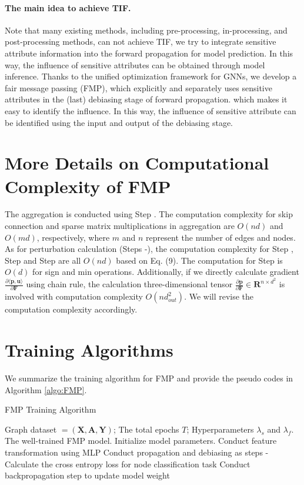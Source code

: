 \documentclass[letterpaper]{article} %
\theoremstyle{plain}
\theoremstyle{definition}
\theoremstyle{remark}
\begin{document}
\paragraph{The main idea to achieve TIF.} Note that many existing methods, including pre-processing, in-processing, and post-processing methods, can not achieve TIF, we try to integrate sensitive attribute information into the forward propagation for model prediction. In this way, the influence of sensitive attributes can be obtained through model inference. Thanks to the unified optimization framework for GNNs, we develop a fair message passing (FMP), which explicitly and separately uses sensitive attributes in the (last) debiasing stage of forward propagation. which makes it easy to identify the influence. In this way,  the influence of sensitive attribute can be identified using the input and output of the debiasing stage. 

\section{More Details on Computational Complexity of FMP}
The aggregation is conducted using Step \textbf{}. The computation complexity for skip connection and sparse matrix multiplications in aggregation are $O(nd)$ and $O(md)$, respectively, where $m$ and $n$ represent the number of edges and nodes. As for perturbation calculation (Steps \textbf{}-\textbf{}), the computation complexity for Step \textbf{}, Step \textbf{} and Step \textbf{} are all $O(nd)$ based on Eq. (9). The computation for Step \textbf{} is $O(d)$ for sign and min operations. Additionally, if we directly calculate gradient $\frac{\partial \langle \mathbf{p}, \mathbf{u}\rangle}{\partial \mathbf{F}}$ using chain rule, the calculation three-dimensional tensor $\frac{\partial \mathbf{p}}{\partial \mathbf{F}}\in \mathbf{R}^{n\times d^2}$ is involved with computation complexity $O(nd_{out}^2)$. We will revise the computation complexity accordingly.

\section{Training Algorithms}
We summarize the training algorithm for FMP and provide the pseudo codes in Algorithm \ref{algo:FMP}.

\begin{algorithm}[htb]
   \caption{FMP Training Algorithm}
   \label{algo:FMP}
\begin{algorithmic}
    Graph dataset $\mathcal=(\mathbf{X}, \mathbf{A}, \mathbf{Y})$; The total epochs $T$; Hyperparameters $\lambda_{s}$ and $\lambda_{f}$.
    The well-trained FMP model.
   \STATE Initialize model parameters.
   \STATE Conduct feature transformation using MLP
   \STATE Conduct propagation and debiasing as steps \textbf{}-\textbf{}
    \STATE Calculate the cross entropy loss for node classification task
    \STATE Conduct backpropagation step to update model weight
   \ENDFOR
\end{algorithmic}
\end{algorithm}
\end{document}
